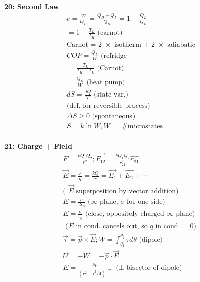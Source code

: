 \documentclass[twoside,draft]{article}
\begin{document}
\begin{multicols}{3}
  \textbf{20: Second Law}
  \begin{align*}
    e = \frac{W}{Q_H} = \frac{Q_H - Q_L}{Q_H} = 1 - \frac{Q_L}{Q_H} \\
    = 1 - \frac{T_L}{T_H} \text{ (carnot)} \\
    \text{Carnot = 2 $\times$ isotherm + 2 $\times$ adiabatic} \\
    COP = \frac{Q_L}{W} \text{ (refridge} \\
    = \frac{T_L}{T_H - T_L} \text{ (Carnot)} \\
    = \frac{Q_H}{W} \text{ (heat pump)} \\
    dS = \frac{dQ}{T} \text{ (state var.)} \\
    \text{(def. for reversible process)} \\
    \Delta S \geq 0 \text{ (spontaneous)} \\
    S = k \ln W, W = \text{ \# microstates} \\
  \end{align*}
  
  \textbf{21: Charge + Field}
  \begin{align*}
    F = \frac{kQ_1Q_2}{r^2};
    \vec{F_{12}} = \frac{kQ_1Q_2}{r^2_{21}} \hat{r_{21}} \\
    \vec{E} = \frac{\vec{F}}{q} = \frac{kQ}{r}
    = \vec{E_1} + \vec{E_2} + \cdots \\
    \text{( $\vec{E}$ superposition by vector addition)} \\
    E = \frac{\sigma}{2\epsilon_0} \text{ ($\infty$ plane,
      $\sigma$ for one side)} \\
    E = \frac{\sigma}{\epsilon_0} \text{ (close, oppositely
      charged $\infty$ plane)} \\
    \text{ ($E$ in cond. cancels out, so $q$ in cond. = 0) } \\
    \vec{\tau} = \vec{p} \times \vec{E};
    W = \int_{\theta_1}^{\theta_2} \tau d\theta \text{ (dipole) } \\
    U = -W = -\vec{p} \cdot \vec{E} \\
    E = \frac{kp}{(r^2+l^2/4)^{3/2}} \text{ ($\perp$ bisector of dipole) } \\
  \end{align*}

\end{multicols}
\end{document}
